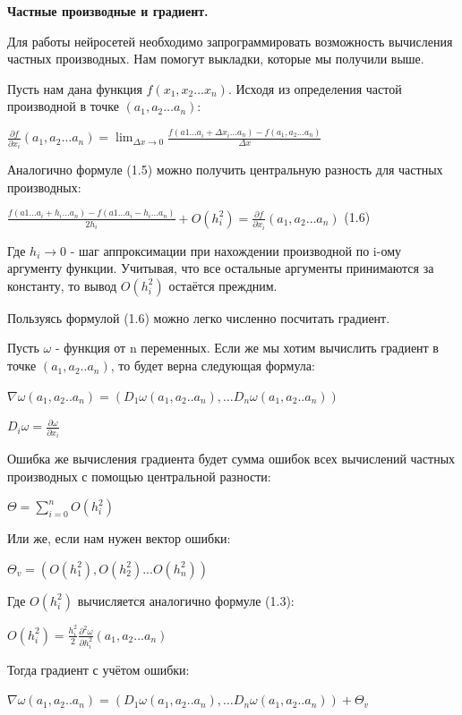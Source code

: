 \documentclass[12pt]{extarticle}
\begin{document}
	\centerline{\textbf{Частные производные и градиент.}}
	Для работы нейросетей необходимо запрограммировать возможность вычисления частных производных. Нам помогут выкладки, которые мы получили выше. 
	
	Пусть нам дана функция $f(x_1, x_2 \dots x_n)$. Исходя из определения частой производной в точке $(a_1, a_2 \dots a_n)$:
	
	\centerline{$ \frac{\partial f}{\partial x_i}(a_1, a_2 \dots a_n) = \displaystyle\lim_{\Delta x \rightarrow 0}\frac{f(a1 \dots a_i + \Delta x_i \dots a_n) - f(a_1, a_2 \dots a_n) } {\Delta x} $}
	
	Аналогично формуле (1.5) можно получить центральную разность для частных производных:
	
	\centerline{$\frac{f(a1 \dots a_i + h_i \dots a_n) - f(a1 \dots a_i - h_i \dots a_n)}{2h_i} + O(h_i^2) = \frac{\partial f}{\partial x_i}(a_1, a_2 \dots a_n)$ (1.6)}  
	
	Где $h_i \rightarrow 0$ - шаг аппроксимации при нахождении производной по i-ому аргументу функции. Учитывая, что все остальные аргументы принимаются за константу, то вывод $O(h_i^2)$ остаётся преждним. 
	
	Пользуясь формулой (1.6) можно легко численно посчитать градиент. 
	
	Пусть $\omega$ - функция от n переменных. Если же мы хотим вычислить градиент в точке $(a_1, a_2 .. a_n)$, то будет верна следующая формула:
	
	\centerline{$\nabla \omega(a_1, a_2 .. a_n) = (D_1\omega(a_1, a_2 .. a_n), \dots D_n\omega(a_1, a_2 .. a_n))$}
	\centerline{$D_i \omega = \frac{\partial \omega}{\partial x_i}$}
	\newpage
	Ошибка же вычисления градиента будет сумма ошибок всех вычислений частных производных с помощью центральной разности:
		
		\centerline{$\Theta = \displaystyle\sum_{i=0}^{n} O(h_i^2)$}
	
	Или же, если нам нужен вектор ошибки:
	
		\centerline{$\Theta_v = (O(h_1^2), O(h_2^2)... O(h_n^2))$}
		
	Где $O(h_i^2)$ вычисляется аналогично формуле (1.3):
	
		\centerline{$O(h_i^2) = \frac{h_i^2}{2} \frac{\partial^2 \omega}{\partial h_i^2}(a_1, a_2... a_n)$}
		
	Тогда градиент с учётом ошибки:
	
		\centerline{$\nabla \omega(a_1, a_2 .. a_n) = (D_1\omega(a_1, a_2 .. a_n), \dots D_n\omega(a_1, a_2 .. a_n)) + \Theta_v$}
	
\end{document}
